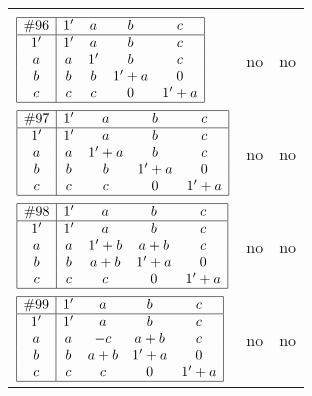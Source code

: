 \documentclass[12pt]{article}
\theoremstyle{definition}
\newcommand{\join}{\mathbin{+}}%
\newcommand{\id}{{1'}}%
\begin{document}
\begin{center}
\begin{longtable}{l|c|c}
{\begin{tikzpicture}[<->,shorten <=1pt,shorten >=1pt,label distance=0mm, font=\small]
\end{tikzpicture}
}      \\[15mm]

$
\begin{array}{|c|cccc|} \hline
\#96 & \id & a & b & c \\ \hline
\id & \id & a & b & c \\
a & a & \id & b & c \\
b & b & b & \id \join a & 0 \\
c & c & c & 0 & \id \join a \\ \hline
\end{array}
$
 & no  
 & no      \\[15mm]

$
\begin{array}{|c|cccc|} \hline
\#97 & \id & a & b & c \\ \hline
\id & \id & a & b & c \\
a & a & \id \join a & b & c \\
b & b & b & \id \join a & 0 \\
c & c & c & 0 & \id \join a \\ \hline
\end{array}
$
 & no  
 & no      \\[15mm]

$
\begin{array}{|c|cccc|} \hline
\#98 & \id & a & b & c \\ \hline
\id & \id & a & b & c \\
a & a & \id \join b & a \join b & c \\
b & b & a \join b & \id \join a & 0 \\
c & c & c & 0 & \id \join a \\ \hline
\end{array}
$
 & no  
 & no      \\[15mm]

$
\begin{array}{|c|cccc|} \hline
\#99 & \id & a & b & c \\ \hline
\id & \id & a & b & c \\
a & a & -c & a \join b & c \\
b & b & a \join b & \id \join a & 0 \\
c & c & c & 0 & \id \join a \\ \hline
\end{array}
$
 & no  
 & no      \\[15mm]


\end{longtable}
\end{center}
\end{document}
